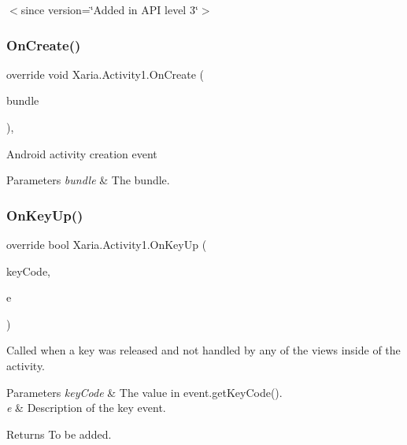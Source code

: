 $<$since version=\char`\"{}\+Added in A\+P\+I level 3\char`\"{}$>$ \mbox{\label{classXaria_1_1Activity1_a1b2c637e080b9032389a43705d193581}} 
\subsubsection{\texorpdfstring{On\+Create()}{OnCreate()}}
{\footnotesize\ttfamily override void Xaria.\+Activity1.\+On\+Create (\begin{DoxyParamCaption}\item[{Bundle}]{bundle }\end{DoxyParamCaption})\hspace{0.3cm}{\ttfamily [inline]}, {\ttfamily [protected]}}



Android activity creation event 


\begin{DoxyParams}{Parameters}
{\em bundle} & The bundle.\\
\hline
\end{DoxyParams}
\mbox{\label{classXaria_1_1Activity1_ab27a73ce9dd28a79774b7c10e3630235}} 
\subsubsection{\texorpdfstring{On\+Key\+Up()}{OnKeyUp()}}
{\footnotesize\ttfamily override bool Xaria.\+Activity1.\+On\+Key\+Up (\begin{DoxyParamCaption}\item[{\mbox{[}\+Generated\+Enum\mbox{]} Keycode}]{key\+Code,  }\item[{Key\+Event}]{e }\end{DoxyParamCaption})\hspace{0.3cm}{\ttfamily [inline]}}



Called when a key was released and not handled by any of the views inside of the activity. 


\begin{DoxyParams}{Parameters}
{\em key\+Code} & The value in event.\+get\+Key\+Code().\\
\hline
{\em e} & Description of the key event.\\
\hline
\end{DoxyParams}
\begin{DoxyReturn}{Returns}
To be added. 
\end{DoxyReturn}


